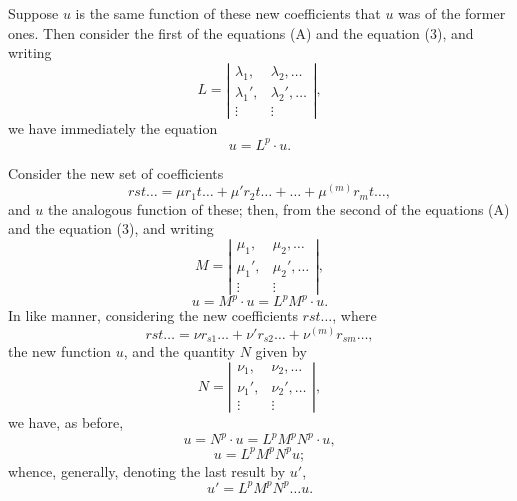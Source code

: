\documentclass[11pt,a4paper]{book}
\begin{document}
Suppose $u$ is the same function of these new coefficients that $u$ was of the former
ones. Then consider the first of the equations (A) and the equation (3), and writing
\[
L = \left|\begin{array}{cc}
\lambda_1, & \lambda_2, \ldots \\
\lambda_1', & \lambda_2', \ldots \\
\vdots & \vdots
\end{array}\right|
\tag{10},
\]
we have immediately the equation
\[
u = L^p \cdot u
\tag{11}.
\]

Consider the new set of coefficients
\[
rst\ldots = \mu r_1 t\ldots + \mu' r_2 t\ldots + \ldots + \mu^{(m)} r_m t\ldots
\tag{12},
\]
and $u$ the analogous function of these; then, from the second of the equations (A)
and the equation (3), and writing
\[
M = \left|\begin{array}{cc}
\mu_1, & \mu_2, \ldots \\
\mu_1', & \mu_2', \ldots \\
\vdots & \vdots
\end{array}\right|
\tag{13},
\]
\[
u = M^p \cdot u = L^p M^p \cdot u
\tag{14}.
\]
In like manner, considering the new coefficients $rst\ldots$, where
\[
rst\ldots = \nu r_{s1} \ldots + \nu' r_{s2} \ldots + \nu^{(m)} r_{sm} \ldots
\tag{15},
\]
the new function $u$, and the quantity $N$ given by
\[
N = \left|\begin{array}{cc}
\nu_1, & \nu_2, \ldots \\
\nu_1', & \nu_2', \ldots \\
\vdots & \vdots
\end{array}\right|
\tag{16},
\]
we have, as before,
\[
u = N^p \cdot u = L^p M^p N^p \cdot u
\tag{17},
\]
\[
u = L^p M^p N^p u
\tag{18};
\]
whence, generally, denoting the last result by $u'$,
\[
u' = L^p M^p N^p \ldots u
\tag{B, 1}.
\]
\end{document}
